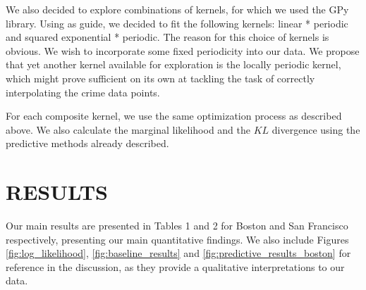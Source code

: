 \documentclass[letterpaper, 11 pt, conference]{ieeeconf}  %
\begin{document}
We also decided to explore combinations of kernels, for which we used the GPy library. Using \cite{c3} as guide, we decided to fit the following kernels: linear * periodic and squared exponential * periodic. The reason for this choice of kernels is obvious. We wish to incorporate some fixed periodicity into our data. We propose that yet another kernel available for exploration is the locally periodic kernel, which might prove sufficient on its own at tackling the task of correctly interpolating the crime data points. 

For each composite kernel, we use the same optimization process as described above. We also calculate the marginal likelihood and the $KL$ divergence using the predictive methods already described. 

\section{RESULTS}

Our main results are presented in Tables 1 and 2 for Boston and San Francisco respectively, presenting our main quantitative findings. We also include Figures \ref{fig:log_likelihood}, \ref{fig:baseline_results} and \ref{fig:predictive_results_boston} for reference in the discussion, as they provide a qualitative interpretations to our data.
\end{document}
